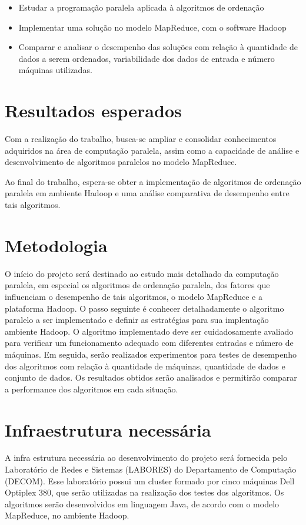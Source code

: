 \begin{itemize}
\item Estudar a programação paralela aplicada à algoritmos de ordenação
\item Implementar uma solução no modelo MapReduce, com o software Hadoop
\item Comparar e analisar o desempenho das soluções com relação à quantidade de dados a serem ordenados, variabilidade dos dados de entrada e número máquinas utilizadas.
\end{itemize}

\section{Resultados esperados}

Com a realização do trabalho, busca-se ampliar e consolidar conhecimentos adquiridos na área de computação paralela, assim como
a capacidade de análise e desenvolvimento de algoritmos paralelos no modelo MapReduce. 


Ao final do trabalho, espera-se obter a implementação de algoritmos de ordenação paralela em ambiente Hadoop e uma análise comparativa de desempenho entre tais algoritmos.

\section{Metodologia}

O início do projeto será destinado ao estudo mais detalhado da computação paralela, em especial os algoritmos de ordenação paralela, dos fatores que influenciam o desempenho de tais algoritmos, o modelo MapReduce e a plataforma Hadoop. O passo seguinte é conhecer detalhadamente o algoritmo paralelo a ser implementado e definir as estratégias para sua implentação ambiente Hadoop. 
O algoritmo implementado deve ser cuidadosamente avaliado para verificar um funcionamento adequado com diferentes entradas e número de máquinas. 
Em seguida, serão realizados experimentos para testes de desempenho dos algoritmos com relação à quantidade de máquinas, quantidade de dados e conjunto de dados.  Os resultados obtidos serão analisados e permitirão comparar a performance dos algoritmos em cada situação. 


\section{Infraestrutura necessária}

A infra estrutura necessária ao desenvolvimento do projeto será fornecida pelo Laboratório de Redes e Sistemas (LABORES) do Departamento de Computação (DECOM). Esse laboratório possui um cluster formado por cinco máquinas Dell Optiplex 380, que serão utilizadas na realização dos testes dos algoritmos. Os algoritmos serão desenvolvidos em linguagem Java, de acordo com o modelo MapReduce, no ambiente Hadoop. 

